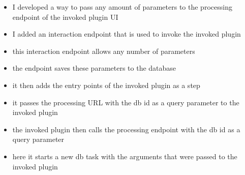 \documentclass[
  a4paper,  %
  twoside,  %
  bibliography=totoc,
  headsepline,
  cleardoublepage=empty,
  parskip=half,
  draft=false
]{scrbook}
\begin{document}
\begin{itemize}
  \begin{itemize}
    \item I developed a way to pass any amount of parameters to the processing endpoint of the invoked plugin UI
    \item I added an interaction endpoint that is used to invoke the invoked plugin
    \item this interaction endpoint allows any number of parameters
    \item the endpoint saves these parameters to the database
    \item it then adds the entry points of the invoked plugin as a step
    \item it passes the processing URL with the db id as a query parameter to the invoked plugin
    \item the invoked plugin then calls the processing endpoint with the db id as a query parameter
    \item here it starts a new db task with the arguments that were passed to the invoked plugin 
  \end{itemize}
\end{itemize}
\end{document}
